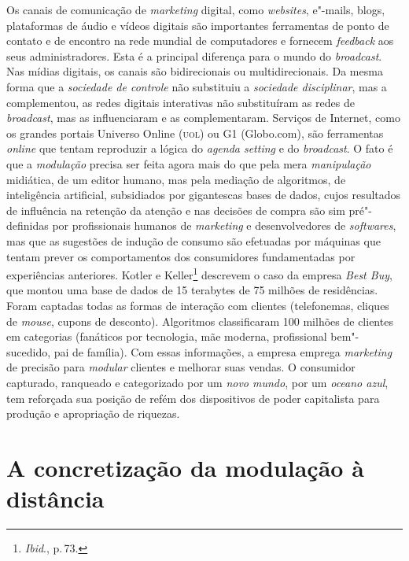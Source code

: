 Os canais de comunicação de \textit{marketing} digital, como
\textit{websites}, e"-mails, blogs, plataformas de áudio e vídeos digitais
são importantes ferramentas de ponto de contato e de encontro na rede
mundial de computadores e fornecem \textit{feedback} aos seus
administradores. Esta é a principal diferença para o mundo do
\textit{broadcast}. Nas mídias digitais, os canais são bidirecionais ou
multidirecionais. Da mesma forma que a \textit{sociedade de controle} não
substituiu a \textit{sociedade disciplinar}, mas a complementou, as redes
digitais interativas não substituíram as redes de \textit{broadcast}, mas
as influenciaram e as complementaram. Serviços de Internet, como os
grandes portais Universo Online (\textsc{uol}) ou G1 (Globo.com), são ferramentas
\textit{online} que tentam reproduzir a lógica do \textit{agenda setting} e
do \textit{broadcast}. O fato é que a \textit{modulação} precisa ser feita
agora mais do que pela mera \textit{manipulação} midiática, de um editor
humano, mas pela mediação de algoritmos, de inteligência artificial,
subsidiados por gigantescas bases de dados, cujos resultados de
influência na retenção da atenção e nas decisões de compra são sim
pré"-definidas por profissionais humanos de \textit{marketing} e
desenvolvedores de \textit{softwares}, mas que as sugestões de indução de
consumo são efetuadas por máquinas que tentam prever os comportamentos
dos consumidores fundamentadas por experiências anteriores. Kotler e
Keller\footnote{\textit{Ibid}., p.\,73.} descrevem o caso da empresa \textit{Best Buy}, que
montou uma base de dados de 15 terabytes de 75 milhões de residências.
Foram captadas todas as formas de interação com clientes (telefonemas,
cliques de \textit{mouse}, cupons de desconto). Algoritmos classificaram
100 milhões de clientes em categorias (fanáticos por tecnologia, mãe
moderna, profissional bem"-sucedido, pai de família). Com essas
informações, a empresa emprega \textit{marketing} de precisão para
\textit{modular} clientes e melhorar suas vendas. O consumidor capturado,
ranqueado e categorizado por um \textit{novo mundo}, por um \textit{oceano
azul}, tem reforçada sua posição de refém dos dispositivos de poder
capitalista para produção e apropriação de riquezas.

\section{A concretização da modulação à distância}

